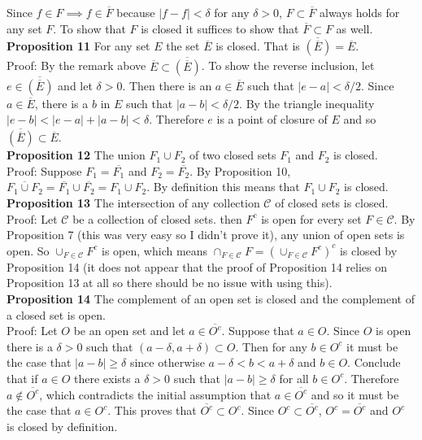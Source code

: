 \documentclass[a4paper]{article}
\begin{document}
Since $f \in F \implies f \in \overline{F}$ because $|f-f| < \delta$ for any $\delta > 0$, $F\subset \overline{F}$ always holds for any set $F$. To show that $F$ is closed it suffices to show that $\overline{F} \subset F$ as well.\\

{\bf Proposition 11} For any set $E$ the set $\overline{E}$ is closed. That is $\overline{\left(\overline{E}\right)} =\overline{E} $.\\

Proof: By the remark above $\overline{E} \subset \overline{\left(\overline{E}\right)}$. To show the reverse inclusion, let $e \in \overline{\left(\overline{E}\right)}$ and let $\delta >0$. Then there is an $a \in \overline{E}$ such that $|e-a| < \delta / 2$. Since $a \in \overline{E}$, there is a $b$ in $E$ such that $|a-b| < \delta / 2$. By the triangle inequality $|e-b| < |e-a| + |a-b| < \delta$. Therefore $e$ is a point of closure of $E$ and so $\overline{\left(\overline{E}\right)} \subset \overline{E}$. \\

{\bf Proposition 12} The union $F_1\cup F_2$ of two closed sets $F_1$ and $F_2$ is closed. \\

Proof: Suppose $F_1 = \overline{F_1}$ and $F_2 = \overline{F_2}$. By Proposition 10, $\overline{F_1 \cup F_2} = \overline{F_1}\cup \overline{F_2} = F_1 \cup F_2$. By definition this means that $F_1 \cup F_2$ is closed. \\

{\bf Proposition 13} The intersection of any collection $\mathcal{C}$ of closed sets is closed. \\

Proof: Let $\mathcal{C}$ be a collection of closed sets. then $F^c$ is open for every set $F \in \mathcal{C}$. By Proposition 7 (this was very easy so I didn't prove it), any union of open sets is open. So $\cup_{F \in \mathcal{C}} F^c$ is open, which means $\cap_{F \in \mathcal{C}} F = \left(\cup_{F \in \mathcal{C}} F^c\right)^c$ is closed by Proposition 14 (it does not appear that the proof of Proposition 14 relies on Proposition 13 at all so there should be no issue with using this). \\

{\bf Proposition 14} The complement of an open set is closed and the complement of a closed set is open. \\

Proof: Let $O$ be an open set and let $a \in \overline{O^c}$. Suppose that $a \in O$. Since $O$ is open there is a $\delta >0$ such that $(a-\delta, a+\delta) \subset O$. Then for any $b \in O^c$ it must be the case that $|a-b|\geq \delta$ since otherwise $a-\delta < b < a+ \delta$ and $b \in O$. Conclude that if $a \in O$ there exists a $\delta > 0$ such that $|a-b| \geq \delta$ for all $b \in O^c$. Therefore $a \not \in \overline{O^c}$, which contradicts the initial assumption that $a \in \overline{O^c}$ and so it must be the case that $a \in O^c$. This proves that $\overline{O^c} \subset O^c$. Since $O^c \subset \overline{O^c}$, $O^c = \overline{O^c}$ and $O^c$ is closed by definition. \\
\end{document}
